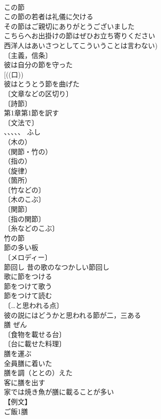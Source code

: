\documentclass[8pt]{extreport}
\begin{document}
\begin{CJK}{UTF8}{min}
\\	この節 
\\	この節の若者は礼儀に欠ける 
\\	その節はご親切にありがとうございました 
\\	こちらへお出掛けの節はぜひお立ち寄りください 
\\	西洋人はあいさつとしてこういうことは言わない) 
\\	〔主義，信条〕
\\	彼は自分の節を守った 
\\	[((口)) 
\\	彼はとうとう節を曲げた 
\\	〔文章などの区切り〕
\\	〔詩節〕
\\	第1章第1節を訳す 
\\	〔文法で〕
\\	、、、、、 ふし 
\\	（木の）
\\	（関節・竹の）
\\	（指の）
\\	（旋律）
\\	（箇所）
\\	〔竹などの〕
\\	〔木のこぶ〕
\\	〔関節〕
\\	〔指の関節〕
\\	〔糸などのこぶ〕
\\	竹の節 
\\	節の多い板 
\\	〔メロディー〕
\\	節回し 昔の歌のなつかしい節回し 
\\	歌に節をつける 
\\	節をつけて歌う 
\\	節をつけて読む 
\\	〔…と思われる点〕
\\	彼の説にはどうかと思われる節が二，三ある 
\\	膳	ぜん	
\\	〔食物を載せる台〕
\\	〔台に載せた料理〕
\\	膳を運ぶ 
\\	全員膳に着いた 
\\	膳を調（ととの）えた 
\\	客に膳を出す 
\\	家では焼き魚が膳に載ることが多い 
\\	【例文】 
\\	ご飯1膳 

\end{CJK}
\end{document}

